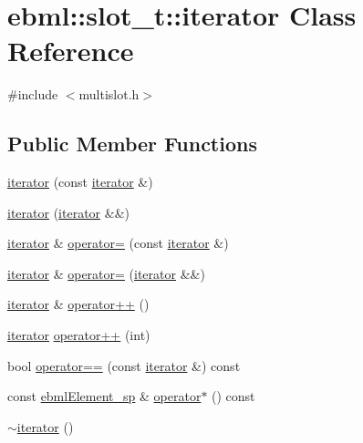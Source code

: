\hypertarget{classebml_1_1slot__t_1_1iterator}{}\section{ebml\+:\+:slot\+\_\+t\+:\+:iterator Class Reference}
\label{classebml_1_1slot__t_1_1iterator}


{\ttfamily \#include $<$multislot.\+h$>$}

\subsection*{Public Member Functions}
\begin{DoxyCompactItemize}
\item 
\mbox{\hyperlink{classebml_1_1slot__t_1_1iterator_a2cbcf89e227e906891cdc9b44d102923}{iterator}} (const \mbox{\hyperlink{classebml_1_1slot__t_1_1iterator}{iterator}} \&)
\item 
\mbox{\hyperlink{classebml_1_1slot__t_1_1iterator_ae9bbbe8d45a8c2355d0ce40caa7abd8b}{iterator}} (\mbox{\hyperlink{classebml_1_1slot__t_1_1iterator}{iterator}} \&\&)
\item 
\mbox{\hyperlink{classebml_1_1slot__t_1_1iterator}{iterator}} \& \mbox{\hyperlink{classebml_1_1slot__t_1_1iterator_aca6887ce0f8383c21dcfb0680214e73b}{operator=}} (const \mbox{\hyperlink{classebml_1_1slot__t_1_1iterator}{iterator}} \&)
\item 
\mbox{\hyperlink{classebml_1_1slot__t_1_1iterator}{iterator}} \& \mbox{\hyperlink{classebml_1_1slot__t_1_1iterator_a1e97d2a7f47c761f0dbd29bf2ee1b369}{operator=}} (\mbox{\hyperlink{classebml_1_1slot__t_1_1iterator}{iterator}} \&\&)
\item 
\mbox{\hyperlink{classebml_1_1slot__t_1_1iterator}{iterator}} \& \mbox{\hyperlink{classebml_1_1slot__t_1_1iterator_a189cc339bcc0dcb8171e32ea3b3484b8}{operator++}} ()
\item 
\mbox{\hyperlink{classebml_1_1slot__t_1_1iterator}{iterator}} \mbox{\hyperlink{classebml_1_1slot__t_1_1iterator_a4a603bbb4c0da50cec88a696ba243106}{operator++}} (int)
\item 
bool \mbox{\hyperlink{classebml_1_1slot__t_1_1iterator_a2225c5a678589a31fe2b8a9dc8951ed1}{operator==}} (const \mbox{\hyperlink{classebml_1_1slot__t_1_1iterator}{iterator}} \&) const
\item 
const \mbox{\hyperlink{namespaceebml_adad533b7705a16bb360fe56380c5e7be}{ebml\+Element\+\_\+sp}} \& \mbox{\hyperlink{classebml_1_1slot__t_1_1iterator_a98eff8fce04b26a80475cbe7f8e6ee82}{operator$\ast$}} () const
\item 
\mbox{\hyperlink{classebml_1_1slot__t_1_1iterator_af0d5965928030bc363ae1e0e011e4fe6}{$\sim$iterator}} ()
\end{DoxyCompactItemize}
